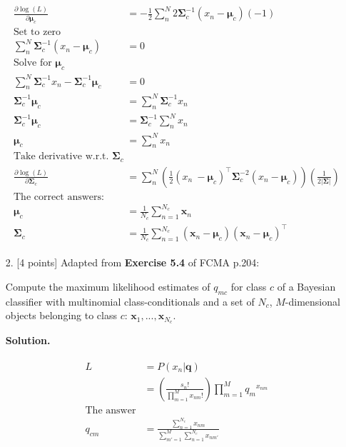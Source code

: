 \documentclass[10pt]{article}
\begin{document}
\begin{itemize}
\begin{eqnarray*}
\begin{aligned}
\frac{\partial \log(L)}{\partial \boldsymbol \mu_c} 
&= -\frac{1}{2} \sum_n^N 2 \boldsymbol {\Sigma}_c^{-1} (x_n - \boldsymbol {\mu}_c) (-1)
\\
\text{Set to zero}
\\
\sum_n^N \boldsymbol {\Sigma}_c^{-1} (x_n - \boldsymbol {\mu}_c) &= 0
\\
\text{Solve for $\boldsymbol \mu_c$}
\\
\sum_n^N \boldsymbol {\Sigma}_c^{-1} x_n - \boldsymbol {\Sigma}_c^{-1} \boldsymbol {\mu}_c &= 0
\\
\boldsymbol {\Sigma}_c^{-1} \boldsymbol {\mu}_c &= \sum_n^N \boldsymbol {\Sigma}_c^{-1} x_n 
\\
\boldsymbol {\Sigma}_c^{-1} \boldsymbol {\mu}_c &= \boldsymbol {\Sigma}_c^{-1} \sum_n^N  x_n 
\\
\boldsymbol {\mu}_c &= \sum_n^N  x_n 
\\
\text{Take derivative w.r.t. $\boldsymbol {\Sigma}_c$}
\\
\frac{\partial \log(L)}{\partial \boldsymbol {\Sigma}_c} 
&= \sum_n^N
\left( \frac{1}{2} (x_n\ - \boldsymbol {\mu}_c)^\top \boldsymbol {\Sigma}_c^{-2} (x_n - \boldsymbol {\mu}_c) \right)
\left( \frac{1}{2 | \boldsymbol \Sigma |} \right)
\\
\text{The correct answers:}
\\
\boldsymbol{\mu}_c &= \frac{1}{N_c} \sum_{n=1}^{N_c} \mathbf{x}_n
\\
\boldsymbol{\Sigma}_c &= 
\frac{1}{N_c} \sum_{n=1}^{N_c} (\mathbf{x}_n - \boldsymbol{\mu}_c) 
(\mathbf{x}_n - \boldsymbol{\mu}_c)^\top
\end{aligned}
\end{eqnarray*}




\item[2.]  [4 points]
Adapted from {\bf Exercise 5.4} of FCMA p.204:

Compute the maximum likelihood estimates of $q_{mc}$ for class $c$ of a Bayesian classifier with multinomial class-conditionals and a set of $N_c$, $M$-dimensional objects belonging to class $c$: $\mathbf{x}_1, ..., \mathbf{x}_{N_c}$.

{\bf Solution.} %

\begin{eqnarray*}
\begin{aligned}
L &= P(x_n | \mathbf{q})
\\
&= \left( \frac{s_n !}{\prod_{m=1}^M x_{nm} !} \right)
\prod_{m=1}^M {q_m}^{x_{nm}}
\\
\text{The answer}
\\
q_{cm} &= \frac{ \sum_{n=1}^{N_c} x_{nm} } { \sum_{m'=1}^M \sum_{n=1}^{N_c} x_{nm'} }
\end{aligned}
\end{eqnarray*}



\end{itemize}
\end{document}
